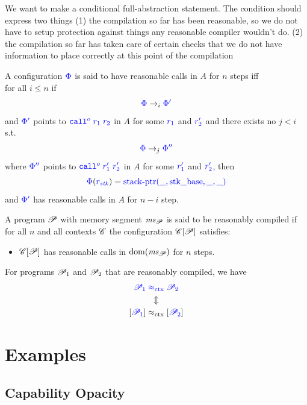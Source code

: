 \documentclass[a4paper]{article}
\begin{document}
We want to make a conditional full-abstraction statement. The condition should express two things (1) the compilation so far has been reasonable, so we do not have to setup protection against things any reasonable compiler wouldn't do. (2) the compilation so far has taken care of certain checks that we do not have information to place correctly at this point of the compilation
\begin{definition}
  \label{def:check-stack-addr-before-call}
  A configuration $\src{\Phi}$ is said to have reasonable calls in $A$ for $n$ steps iff\\
  for all $i \leq n$ if
  \[
    \src{\Phi} \nstep[i] \src{\Phi'}
  \]
  and $\src{\Phi'}$ points to $\src{\scall{o}{r_1}{r_2}}$ in $A$ for some $\src{r_1}$ and $\src{r_2'}$ and there exists no $j<i$ s.t.
  \[
    \src{\Phi} \nstep[j] \src{\Phi''}
  \]
  where $\src{\Phi''}$ points to $\src{\scall{o}{r_1'}{r_2'}}$ in $A$ for some $\src{r_1'}$ and $\src{r_2'}$,
  then
  \[
    \src{\Phi}(\src{r_\stk}) = \src{\stkptr{\_,\stkb,\_,\_}}
  \]
  and $\src{\Phi'}$ has reasonable calls in $A$ for $n-i$ step.
\end{definition}

\begin{definition}
  A program $\program$ with memory segment $\ms_\program$ is said to be reasonably compiled if for all $n$ and all contexts $\context$ the configuration $\plug{\context}{\program}$ satisfies:
  \begin{itemize}
  \item $\plug{\context}{\program}$ has reasonable calls in $\dom(\ms_\program)$ for $n$ steps.
  \end{itemize}
\end{definition}

\begin{theorem}
  \label{thm:full-abstraction}
  For programs $\program_1$ and $\program_2$ that are reasonably compiled, we have
  \begin{gather*}
    \src{\program_1} \sconeq \src{\program_2}\\
    \Updownarrow\\
    \comp{\src{\program_1}} \tconeq \comp{\src{\program_2}}
  \end{gather*}
\end{theorem}

\clearpage
\section{Examples}
\subsection{Capability Opacity}
\label{subsec:capability-opacity}
\end{document}
